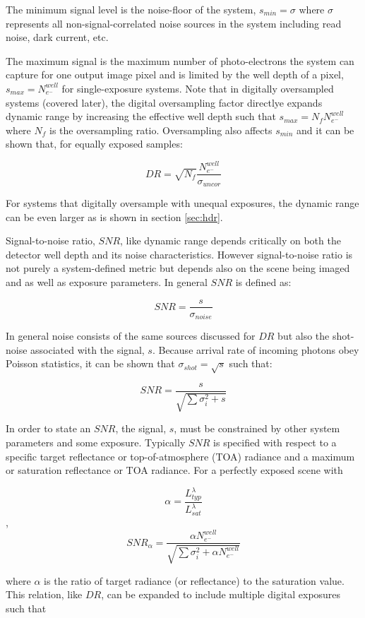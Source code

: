 \documentclass[10pt,journal]{IEEEtran}  %
\begin{document}
The minimum signal level is the noise-floor of the system, $s_{min} = \sigma$ where $\sigma$ represents all non-signal-correlated noise sources in the system including read noise, dark current, etc.

The maximum signal is the maximum number of photo-electrons the system can capture for one output image pixel and is limited by the well depth of a pixel, $s_{max} = N_{e^-}^{well}$ for single-exposure systems.  Note that in digitally oversampled systems (covered later), the digital oversampling factor directlye expands dynamic range by increasing the effective well depth such that $s_{max} = N_f N_{e^-}^{well}$ where $N_f$ is the oversampling ratio.  Oversampling also affects $s_{min}$ and it can be shown that, for equally exposed samples:

\begin{equation}
    DR = \sqrt{N_f}\frac{N_{e^-}^{well}}{\sigma_{uncor}}
\label{eq:DR_OS}
\end{equation}

For systems that digitally oversample with unequal exposures, the dynamic range can be even larger as is shown in section \ref{sec:hdr}.

Signal-to-noise ratio, $SNR$, like dynamic range depends critically on both the detector well depth and its noise characteristics.  However signal-to-noise ratio is not purely a system-defined metric but depends also on the scene being imaged and as well as exposure parameters.  In general $SNR$ is defined as:

$$SNR = \frac{s}{\sigma_{noise}}$$

In general noise consists of the same sources discussed for $DR$ but also the shot-noise associated with the signal, $s$.  Because arrival rate of incoming photons obey Poisson statistics, it can be shown that $\sigma_{shot} = \sqrt{s}$ such that:

$$SNR = \frac{s}{\sqrt{\sum{\sigma_i^2} + s}}$$

In order to state an $SNR$, the signal, $s$, must be constrained by other system parameters and some exposure.  Typically $SNR$ is specified with respect to a specific target reflectance or top-of-atmosphere (TOA) radiance and a maximum or saturation reflectance or TOA radiance.  For a perfectly exposed scene with

$$\alpha = \frac{L_{typ}^\lambda}{L_{sat}^\lambda}$$
,
$$SNR_{\alpha} = \frac{\alpha N_{e^-}^{well}}{\sqrt{\sum{\sigma_i^2} + \alpha N_{e^-}^{well}}}$$

where $\alpha$ is the ratio of target radiance (or reflectance) to the saturation value.  This relation, like $DR$, can be expanded to include multiple digital exposures such that
\end{document}
